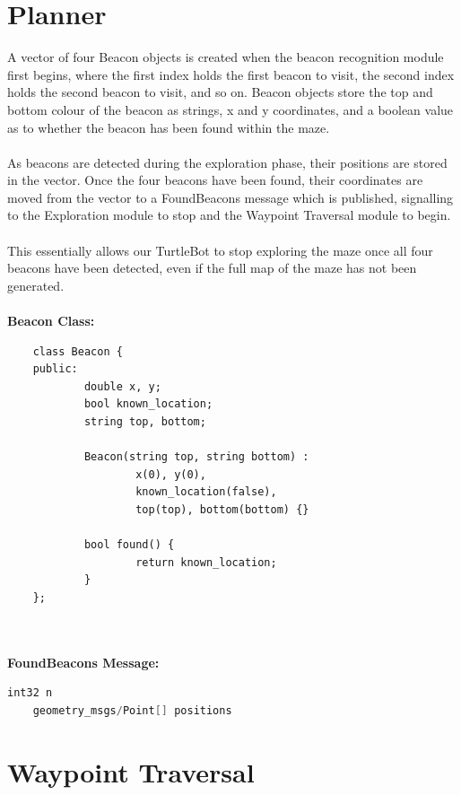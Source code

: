 \documentclass[titlepage,12pt,a4paper]{article}
\begin{document}
\pagebreak


\section*{Planner}

A vector of four Beacon objects is created when the beacon recognition module first begins, where the first index holds the first beacon to visit, the second index holds the second beacon to visit, and so on. Beacon objects store the top and bottom colour of the beacon as strings, x and y coordinates, and a boolean value as to whether the beacon has been found within the maze. \\
\\
As beacons are detected during the exploration phase, their positions are stored in the vector. Once the four beacons have been found, their coordinates are moved from the vector to a FoundBeacons message which is published, signalling to the Exploration module to stop and the Waypoint Traversal module to begin.\\
\\
This essentially allows our TurtleBot to stop exploring the maze once all four beacons have been detected, even if the full map of the maze has not been generated.\\
\\
\textbf{Beacon Class:}
\begin{lstlisting}
	class Beacon {
	public:
    		double x, y;
    		bool known_location;
    		string top, bottom;

    		Beacon(string top, string bottom) :
        			x(0), y(0),
        			known_location(false),
        			top(top), bottom(bottom) {}

    		bool found() {
        			return known_location;
    		}
	};
	
\end{lstlisting}

\textbf{\\FoundBeacons Message:}
\begin{lstlisting}[language=C++]
	int32 n
	geometry_msgs/Point[] positions
\end{lstlisting}


\pagebreak


\section*{Waypoint Traversal}
\end{document}
